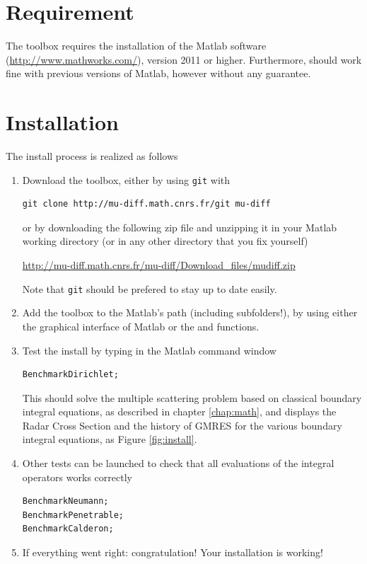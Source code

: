 
\section*{Requirement}

The toolbox \mudiff requires the installation of the Matlab software (\url{http://www.mathworks.com/}), version 2011 or higher. Furthermore,
\mudiff should work fine with previous versions of Matlab, however without any guarantee.

\section*{Installation}

The install process is realized as follows
\begin{enumerate}
\item Download the \mudiff toolbox, either by using \texttt{git} with
\begin{verbatim}
git clone http://mu-diff.math.cnrs.fr/git mu-diff
\end{verbatim} 
or by downloading the following zip file and unzipping it in your Matlab working directory (or in any other directory that you fix yourself)
\begin{center}
\url{http://mu-diff.math.cnrs.fr/mu-diff/Download_files/mudiff.zip}
\end{center}
Note that \texttt{git} should be prefered to stay up to date easily.
\item Add the \mudiff toolbox to the Matlab's path (including subfolders!), by using either the graphical interface of Matlab or the  and  functions.
\item Test the \mudiff install by typing in the Matlab command window
\begin{lstlisting}
BenchmarkDirichlet;
\end{lstlisting}
This should solve the multiple scattering problem based on classical boundary integral equations, as described in chapter \ref{chap:math}, 
and displays the Radar Cross Section and the history of GMRES for the various boundary integral equations, as Figure \ref{fig:install}.
\item Other tests can be launched to check that all evaluations of the integral operators works correctly
\begin{lstlisting}
BenchmarkNeumann;
BenchmarkPenetrable;
BenchmarkCalderon;
\end{lstlisting}
\item If everything went right: congratulation! Your \mudiff installation is  working!
\end{enumerate}

